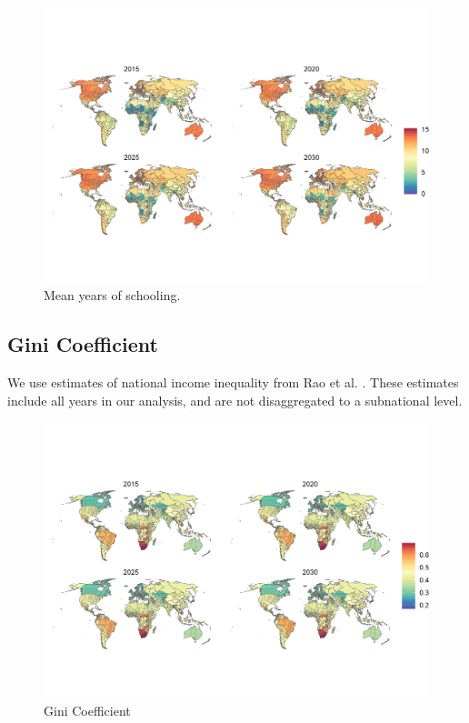 \documentclass{article}
\begin{document}
\begin{figure}[H]
  \centering
  \includegraphics[width=\linewidth]{img/covars/school_mean.png}
  \caption{Mean years of schooling.}
\end{figure}


\subsection{Gini Coefficient}
We use estimates of national income inequality from Rao et al. \citep{Rao2019a}.  These estimates include all years in our analysis, and are not disaggregated to a subnational level.

\begin{figure}[H]
  \centering
  \includegraphics[width=\linewidth]{img/covars/gini.png}
  \caption{Gini Coefficient}
\end{figure}
\end{document}
